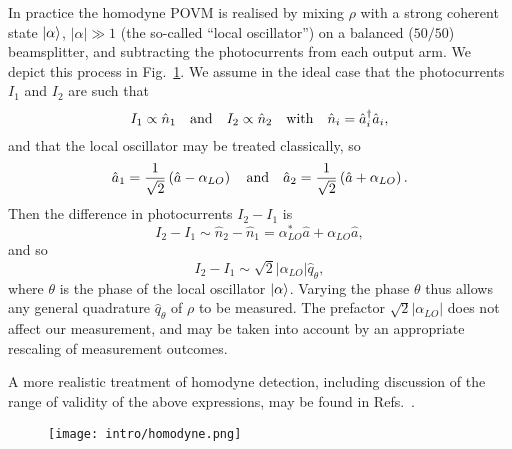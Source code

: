 \noindent In practice the homodyne POVM is realised by mixing $\rho$ with a strong coherent state $\ket{\alpha}$, $\left|\alpha\right| \gg 1$ (the so-called ``local oscillator'') on a balanced ($50/50$) beamsplitter, and subtracting the photocurrents from each output arm. We depict this process in Fig.~\ref{fig:intro_homodyne}. We assume in the ideal case that the photocurrents $I_1$ and $I_2$ are such that
\begin{equation}
I_1 \propto \hat{n}_1 \qq{and} I_2 \propto \hat{n}_2 \qq{with} \hat{n}_i = \hat{a}_i^\dagger \hat{a}_i,
\end{equation}
and that the local oscillator may be treated classically, so
\begin{equation}
\hat{a}_1 = \frac{1}{\sqrt{2}} \left(\hat{a} - \alpha_{LO}\right) \qq{and} \hat{a}_2 = \frac{1}{\sqrt{2}}\left(\hat{a} + \alpha_{LO}\right).
\end{equation}
Then the difference in photocurrents $I_2 - I_1$ is
\begin{equation}
I_2 - I_1 \sim \hat{n}_2 - \hat{n}_1 = \alpha_{LO}^* \hat{a} + \alpha_{LO}\hat{a},
\end{equation}
and so
\begin{equation}
I_2 - I_1 \sim \sqrt{2} \left|\alpha_{LO}\right| \hat{q}_\theta,
\end{equation}
where $\theta$ is the phase of the local oscillator $\ket{\alpha}$. Varying the phase $\theta$ thus allows any general quadrature $\hat{q}_\theta$ of $\rho$ to be measured. The prefactor $\sqrt{2}\left|\alpha_{LO}\right|$ does not affect our measurement, and may be taken into account by an appropriate rescaling of measurement outcomes.

A more realistic treatment of homodyne detection, including discussion of the range of validity of the above expressions, may be found in Refs.~\cite{Leonhardt1997, Serafini2019}.


\begin{figure}[htp]
\centering
\captionsetup{width=0.8\linewidth}
\texttt{[image: intro/homodyne.png]}
\caption{\label{fig:intro_homodyne}}
\end{figure}



\FloatBarrier
